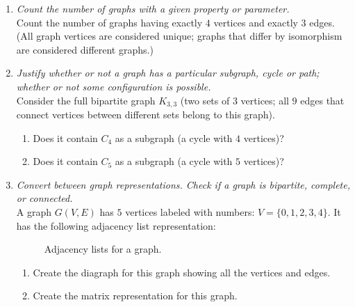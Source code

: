 \documentclass[a4paper,12pt]{article}
\begin{document}
\begin{enumerate}
\item {\small \em  Count the number of graphs with a given property or parameter.}\\
Count the number of graphs having exactly $4$ vertices and
exactly $3$ edges. (All graph vertices are considered unique;
graphs that differ by isomorphism are considered different graphs.)

\item {\small \em  Justify whether or not a graph has a particular subgraph, cycle or path; whether or not some configuration is possible.}\\
Consider the full bipartite graph $K_{3,3}$ (two sets of $3$ vertices; all $9$ edges
that connect vertices between different sets belong to this graph).
\begin{enumerate}
\item Does it contain $C_4$ as a subgraph (a cycle with $4$ vertices)?
\item Does it contain $C_5$ as a subgraph (a cycle with $5$ vertices)?
\end{enumerate}

\item {\small \em  Convert between graph representations.
Check if a graph is bipartite, complete, or connected. }\\
A graph $G(V,E)$ has $5$ vertices labeled with numbers: $V=\{ 0,1,2,3,4 \}$.
It has the following adjacency list representation:

\begin{figure}[!htb]
\caption{\label{fig:part2-graph-adjacency} Adjacency lists for a graph.}
\end{figure}

\begin{enumerate}
\item Create the diagraph for this graph showing all the vertices and edges.
\item Create the matrix representation for this graph.
\end{enumerate}



\end{enumerate}
\end{document}
